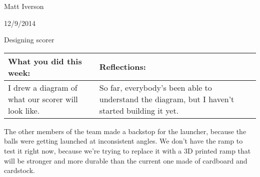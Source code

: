 Matt Iverson

12/9/2014

Designing scorer

\begin{tabular}{|p{5cm}|p{5cm}|}
 \hline
 What you did this week:
 &
 Reflections:
 \\
 \hline
 I drew a diagram of what our scorer will look like.
 &
 So far, everybody's been able to understand the diagram, but I haven't started building it yet.
 \\
 \hline
\end{tabular}

The other members of the team made a backstop for the launcher, because the balls were getting launched at inconsistent angles. We don't have the ramp to test it right now, because we're trying to replace it with a 3D printed ramp that will be stronger and more durable than the current one made of cardboard and cardstock.
